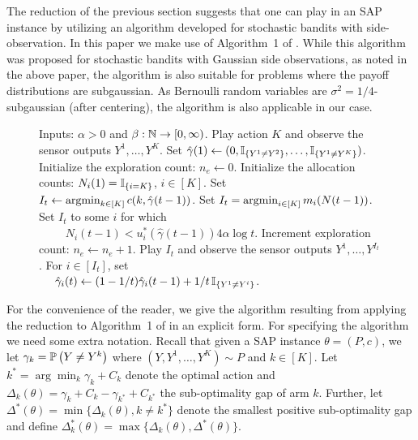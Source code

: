 \newcommand{\set}{\leftarrow}
\newcommand{\hgamma}{\hat{\gamma}}
The reduction of the previous section suggests that one can play in an SAP instance by utilizing 
an algorithm developed for stochastic bandits with side-observation.
In this paper we make use of Algorithm~1 of \citet{WGySz:NIPS15}. 
While this algorithm was proposed for stochastic bandits with Gaussian side observations, 
as noted in the above paper, the algorithm is also suitable for problems where the payoff distributions are subgaussian.
As Bernoulli random variables are $\sigma^2=1/4$-subgaussian (after centering),
the algorithm is also applicable in our case.

\begin{wrapfigure}{L}{0.55\textwidth}
\vspace{-0.4cm}
\begin{minipage}{0.54\textwidth}
\begin{algorithm}[H]
\caption{} %
\label{alg:asym}
\begin{algorithmic}[1]
\STATE Inputs: $\alpha>0$ and $\beta: \mathbb{N} \to [0,\infty)$.
\STATE Play action $K$ and observe the sensor outputs $Y^1,\dots,Y^K$.
\STATE Set $\hgamma(1) \set (0,\one{Y^1\ne Y^2},\dots,\one{Y^1\ne Y^K})$.
\STATE Initialize the exploration count: $n_e \set 0$.
\STATE Initialize the allocation counts: $N_i(1) = \mathbb{I}_{\{i=K\}}$, $i\in [K]$.
	\IF{$\frac{N(t-1)}{4\alpha \log t}\in C(\hgamma(t-1))$} \label{alg:check}
		\STATE Set $I_t \set \argmin_{k\in [K]} c(k,\hgamma(t-1))$. \label{alg:greedy}
	\ELSE
		 \label{alg:starve}
			\STATE Set $I_t = \operatorname{argmin}_{i\in [K]}m_i(N(t-1))$. \label{alg:forced}
		\ELSE
			\STATE Set $I_t$ to some $i$ for which \label{alg:plan} \\
			$\qquad$ $N_i(t-1)< u_i^*(\hgamma(t-1))4\alpha\log t$.
		\ENDIF
		\STATE Increment exploration count: $n_e \set n_e+1$.
	\ENDIF
	\STATE Play $I_t$ and observe the sensor outputs $Y^1,\dots,Y^{I_t}$.
	\STATE For $i\in [I_t]$, set\\
	$\quad$ $\hgamma_i(t) \set (1-1/t) \hgamma_i(t-1) + 1/t \,\one{Y^1\ne Y^i}$.
\ENDFOR
\end{algorithmic}
\end{algorithm}
\end{minipage}
\vspace{-0.3cm}
\end{wrapfigure}

For the convenience of the reader, we give the algorithm resulting from applying the reduction to Algorithm~1 
of \citet{WGySz:NIPS15} in an explicit form.
For specifying the algorithm we need some extra notation.
Recall that given a SAP instance $\theta = (P,c)$, we let $\gamma_k = \mathbb{P}\left(Y\ne Y^k\right)$ where $(Y,Y^1,\dots,Y^K)\sim P$ and $k\in [K]$. Let $k^*=\arg\min_k \gamma_k +C_k$ denote the optimal action and $\Delta_k(\theta)=\gamma_k+C_k-\gamma_{k^*}+C_{k^*}$ the sub-optimality gap of arm $k$. Further, let $\Delta^*(\theta) = \min\{\Delta_k(\theta), k\neq k^* \}$ denote the smallest positive sub-optimality gap and define $\Delta_k^*(\theta) =\max\{\Delta_k(\theta), \Delta^*(\theta)\}$.

